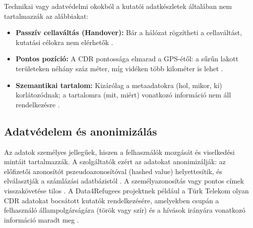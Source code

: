 Technikai vagy adatvédelmi okokból a kutatói adatkészletek általában nem tartalmazzák az alábbiakat:
\begin{itemize}
    \item \textbf{Passzív cellaváltás (Handover):} Bár a hálózat rögzítheti a cellaváltást, kutatási célokra nem elérhetők \cite{pinter2022awakening}.
    \item \textbf{Pontos pozíció:} A CDR pontossága elmarad a GPS-étől: a sűrűn lakott területeken néhány száz méter, míg vidéken több kilométer is lehet \cite{gonzalez2008understanding}.
    \item \textbf{Szemantikai tartalom:} Kizárólag a metaadatokra (hol, mikor, ki) korlátozódnak; a tartalomra (mit, miért) vonatkozó információ nem áll rendelkezésre \cite{batty2012smart}.
\end{itemize}


\subsection{Adatvédelem és anonimizálás}
Az adatok személyes jellegűek, hiszen a felhasználók mozgását és viselkedési mintáit tartalmazzák. A szolgáltatók ezért az adatokat anonimizálják: az előfizetői azonosítót pszeudoazonosítóval (hashed value) helyettesítik, és elválasztják a számlázási adatbázistól \cite{pinter2022awakening}. A személyazonosítás vagy pontos címek visszakövetése tilos \cite{zhang2019connected}. A Data4Refugees projektnek például a Türk Telekom olyan CDR adatokat bocsátott kutatók rendelkezésére, amelyekben csupán a felhasználó állampolgárságára (török vagy szír) és a hívások irányára vonatkozó információ maradt meg \cite{rhoads2020measuring}. 

